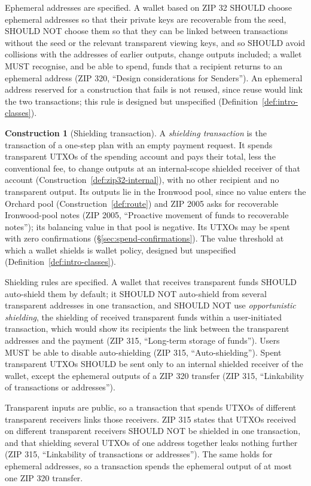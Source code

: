 \documentclass[11pt,a4paper]{article}
\theoremstyle{definition}
\newtheorem{construction}[theorem]{Construction}
\begin{document}
Ephemeral addresses are specified. A wallet based on ZIP 32 SHOULD choose
ephemeral addresses so that their private keys are recoverable from the
seed, SHOULD NOT choose them so that they can be linked between
transactions without the seed or the relevant transparent viewing keys, and
so SHOULD avoid collisions with the addresses of earlier outputs, change
outputs included; a wallet MUST recognise, and be able to spend, funds that
a recipient returns to an ephemeral address (ZIP 320, ``Design
considerations for Senders''). An ephemeral address reserved for a
construction that fails is not reused, since reuse would link the two
transactions; this rule is designed but unspecified
(Definition~\ref{def:intro-classes}).

\begin{construction}[Shielding transaction]\label{def:shielding-tx}
A \emph{shielding transaction} is the transaction of a one-step plan with an
empty payment request. It spends transparent UTXOs of the spending account
and pays their total, less the conventional fee, to change outputs at an
internal-scope shielded receiver of that account
(Construction~\ref{def:zip32-internal}), with no other recipient and no
transparent output. Its outputs lie in the Ironwood pool, since no value
enters the Orchard pool (Construction~\ref{def:route}) and ZIP 2005 asks for
recoverable Ironwood-pool notes (ZIP 2005, ``Proactive movement of funds to
recoverable notes''); its balancing value in that pool is negative. Its
UTXOs may be spent with zero confirmations
(\S\ref{sec:spend-confirmations}). The value threshold at which a wallet
shields is wallet policy, designed but unspecified
(Definition~\ref{def:intro-classes}).
\end{construction}

Shielding rules are specified. A wallet that receives transparent funds
SHOULD auto-shield them by default; it SHOULD NOT auto-shield from several
transparent addresses in one transaction, and SHOULD NOT use
\emph{opportunistic shielding}, the shielding of received transparent funds
within a user-initiated transaction, which would show its recipients the
link between the transparent addresses and the payment (ZIP 315,
``Long-term storage of funds''). Users MUST be able to disable
auto-shielding (ZIP 315, ``Auto-shielding''). Spent transparent UTXOs
SHOULD be sent only to an internal shielded receiver of the wallet, except
the ephemeral outputs of a ZIP 320 transfer (ZIP 315, ``Linkability of
transactions or addresses'').

Transparent inputs are public, so a transaction that spends UTXOs of
different transparent receivers links those receivers. ZIP 315 states that
UTXOs received on different transparent receivers SHOULD NOT be shielded in
one transaction, and that shielding several UTXOs of one address together
leaks nothing further (ZIP 315, ``Linkability of transactions or
addresses''). The same holds for ephemeral addresses, so a transaction
spends the ephemeral output of at most one ZIP 320 transfer.
\end{document}
